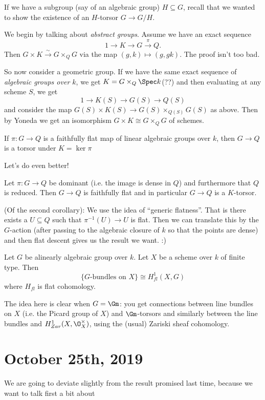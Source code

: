 \documentclass[12pt]{article}
\begin{document}
\brk

If we have a subgroup (say of an algebraic group) $H\subseteq G$, recall that we wanted to show the existence of an $H$-torsor $G\to G/H$.

We begin by talking about \textit{abstract groups}. Assume we have an exact sequence 
\[1\to K\to G\xrightarrow{\pi}Q.\]
Then $G\times K\xrightarrow{\sim}G\times_QG$ via the map $(g,k)\mapsto(g, gk)$. The proof isn't too bad.

So now consider a geometric group. If we have the same exact sequence of \textit{algebraic groups over $k$}, we get $K=G\times_Q\Spec k$(??)
and then evaluating at any scheme $S$, we get 
\[1\to K(S)\to G(S)\to Q(S)\]
and consider the map $G(S)\times K(S)\to G(S)\times_{Q(S)}G(S)$ as above. Then by Yoneda we get an isomorphism $G\times K\cong G\times_Q G$ of schemes.

\begin{cor}
	If $\pi:G\to Q$ is a faithfully flat map of linear algebraic groups over $k$, then $G\to Q$ is a torsor under $K=\ker\pi$
\end{cor}
Let's do even better!
\begin{cor}
	Let $\pi:G\to Q$ be dominant (i.e. the image is dense in $Q$) and furthermore that $Q$ is reduced. Then $G\to Q$ is faithfully flat and in particular $G\to Q$ is a $K$-torsor.
\end{cor}

\begin{prf}
	(Of the second corollary): We use the idea of ``generic flatness''. That is there exists a $U\subseteq Q$ such that $\pi^{-1}(U)\to U$ is flat. Then we can translate this by 
	the $G$-action (after passing to the algebraic closure of $k$ so that the points are dense) and then flat descent gives us the result we want. :)
\end{prf}

\begin{thm}
	Let $G$ be alinearly algebraic group over $k$. Let $X$ be a scheme over $k$ of finite type.
	Then
	\[\{G\text{-bundles on $X$}\}\cong H_{fl}^1(X,G)\]
	where $H_{fl}$ is flat cohomology.
\end{thm}
The idea here is clear when $G=\Gm$: you get connections between line bundles on $X$ (i.e. the Picard group of $X$) and $\Gm$-torsors and similarly between the line bundles and $H_{Zar}^1(X,\O_X^\times)$, 
using the (usual) Zariski sheaf cohomology.

\section{October 25th, 2019}
We are going to deviate slightly from the result promised last time, because we want to talk first a bit about 
\end{document}
